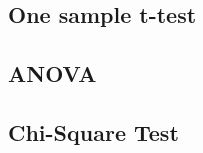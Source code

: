 \documentclass{article}
\begin{document}
\subsection{One sample t-test}
\subsection{ANOVA}
\subsection{Chi-Square Test}
\end{document}
